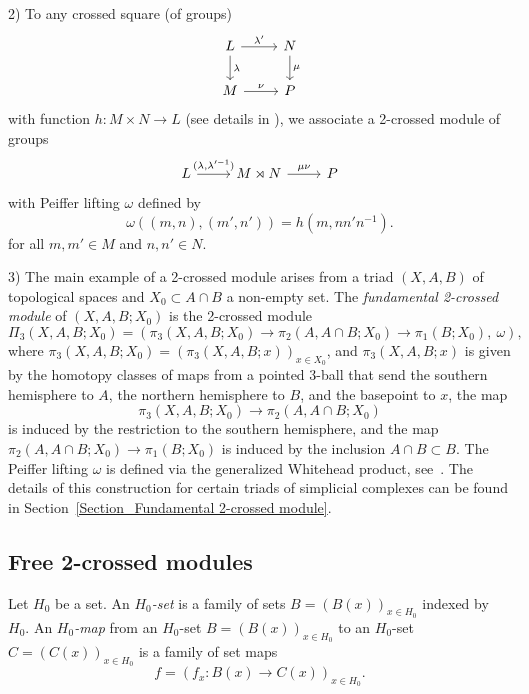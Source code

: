\documentclass[a4paper, oneside]{amsart}
\numberwithin{equation}{subsection}
\theoremstyle{referencedlemma}
\theoremstyle{plain} %
\theoremstyle{remark}
\begin{document}
2) To any crossed square (of groups)
$$
\begin{tikzcd}
L\arrow[d, "\lambda"]\arrow[r, "{\lambda'}"] & N \arrow[d, "\mu"]\\
M \arrow[r, "\nu"] & P
\end{tikzcd}
$$
with function $h\colon M\times N \to L$ (see details in \cite{ellis_crossed_1993}), we associate a 2-crossed module of groups
$$
\begin{tikzcd}
L\arrow[r, "{(\lambda, \lambda'^{-1})}"] & M\rtimes N \arrow[r, "\mu\nu"] & P
\end{tikzcd}
$$
with Peiffer lifting $\omega$ defined by
$$
\omega((m,n),(m',n')) = h(m, nn'n^{-1}).
$$
for all $m, m' \in M$ and $n, n'\in N$.

3) The main example of a 2-crossed module arises from a triad $(X,A,B)$ of topological spaces and $X_0 \subset A\cap B$ a non-empty set.  The \emph{fundamental 2-crossed module} of $(X, A, B; X_0)$ is the 2-crossed module
$$
\Pi_3(X,A,B; X_0) = (\pi_3(X, A, B; X_0) \to \pi_2(A, A\cap B; X_0) \to \pi_1(B; X_0), \ \omega),
$$
where $\pi_3(X,A,B; X_0) = (\pi_3(X,A,B; x))_{x\in X_0}$, and $\pi_3(X,A,B; x)$ is given by the homotopy classes of maps from a pointed 3-ball that send the southern hemisphere to $A$, the northern hemisphere to $B$, and the basepoint to $x$, the map
$$
\pi_3(X, A, B; X_0) \to \pi_2(A, A\cap B; X_0)
$$
is induced by the restriction to the southern hemisphere, and the map $\pi_2(A, A\cap B; X_0) \to \pi_1(B; X_0)$ is induced by the inclusion $A\cap B \subset B$.  The Peiffer lifting $\omega$ is defined via the generalized Whitehead product, see~\cite{martins_fundamental_2011, ellis_crossed_1993}.  The details of this construction for certain triads of simplicial complexes can be found in Section~\ref{Section_Fundamental 2-crossed module}. 




\subsection{Free 2-crossed modules}\label{Free 2-crossed modules}

Let $H_0$ be a set. An \emph{$H_0$-set} is a family of sets $B = (B(x))_{x\in H_0}$ indexed by~$H_0$.  An \emph{$H_0$-map} from an $H_0$-set $B = (B(x))_{x\in H_0}$ to an $H_0$-set $C = (C(x))_{x\in H_0}$ is a family of set maps
$$
f = (f_x\colon B(x) \to C(x))_{x\in H_0}.
$$ 
\end{document}
